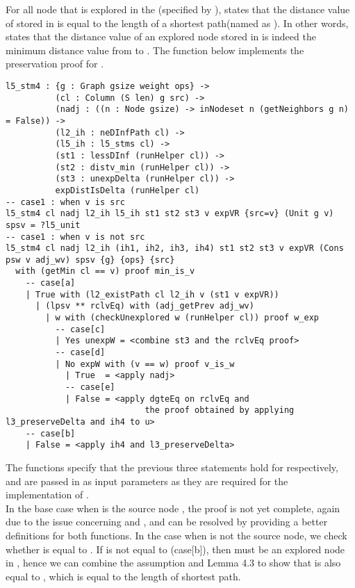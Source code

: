 For all node  that is explored in the  (specified by ),  states that the distance value of  stored in  is equal to the length of a shortest  path(named as ). In other words,  states that the distance value of an explored node  stored in  is indeed the minimum distance value from  to . The function  below implements the preservation proof for .
\begin{lstlisting}
l5_stm4 : {g : Graph gsize weight ops} ->
          (cl : Column (S len) g src) ->
          (nadj : ((n : Node gsize) -> inNodeset n (getNeighbors g n) = False)) ->
          (l2_ih : neDInfPath cl) ->
          (l5_ih : l5_stms cl) ->
          (st1 : lessDInf (runHelper cl)) ->
          (st2 : distv_min (runHelper cl)) ->
          (st3 : unexpDelta (runHelper cl)) ->
          expDistIsDelta (runHelper cl)
-- case1 : when v is src
l5_stm4 cl nadj l2_ih l5_ih st1 st2 st3 v expVR {src=v} (Unit g v) spsv = ?l5_unit
-- case1 : when v is not src
l5_stm4 cl nadj l2_ih (ih1, ih2, ih3, ih4) st1 st2 st3 v expVR (Cons psw v adj_wv) spsv {g} {ops} {src}
  with (getMin cl == v) proof min_is_v
  	-- case[a]
    | True with (l2_existPath cl l2_ih v (st1 v expVR))
      | (lpsv ** rclvEq) with (adj_getPrev adj_wv)
        | w with (checkUnexplored w (runHelper cl)) proof w_exp
          -- case[c]
          | Yes unexpW = <combine st3 and the rclvEq proof> 
          -- case[d]
          | No expW with (v == w) proof v_is_w
            | True  = <apply nadj>
            -- case[e]
            | False = <apply dgteEq on rclvEq and 
            				the proof obtained by applying l3_preserveDelta and ih4 to u>
    -- case[b]
    | False = <apply ih4 and l3_preserveDelta>
\end{lstlisting}

The functions  specify that the previous three statements hold for  respectively, and are passed in as input parameters as they are required for the implementation of .
\\

In the base case when  is the source node , the proof is not yet complete, again due to the issue concerning  and , and can be resolved by providing a better definitions for both functions. In the case when  is not the source node, we check whether  is equal to . If  is not equal to (case[b]), then  must be an explored node in , hence we can combine the assumption  and Lemma 4.3  to show that  is also equal to , which is equal to the length of shortest  path. 
\\

